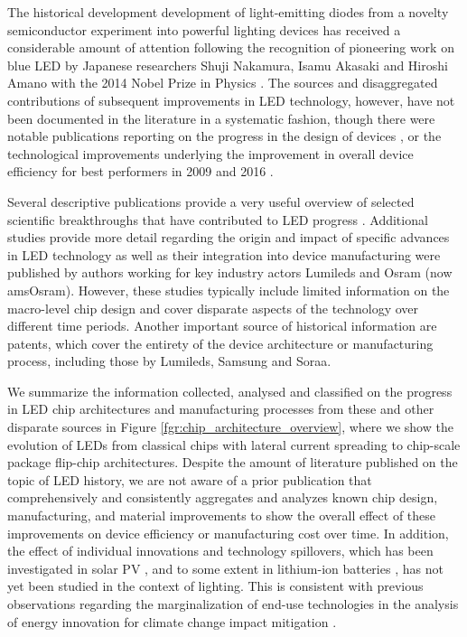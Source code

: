 \documentclass[10pt]{article}
\begin{document}
The historical development development of light-emitting diodes from a novelty semiconductor experiment into powerful lighting devices has received a considerable amount of attention following the recognition of pioneering work on blue LED by Japanese researchers Shuji Nakamura, Isamu Akasaki and Hiroshi Amano with the 2014 Nobel Prize in Physics \cite{Akasaki2015}\cite{Nakamura2015}. The sources and disaggregated contributions of subsequent improvements in LED technology, however, have not been documented in the literature in a systematic fashion, though there were notable publications reporting on the progress in the design of devices \cite{Shchekin2006}\cite{krames2007led}\cite{laubsch2009high}\cite{hahn2014development}, or the technological improvements  underlying the improvement in overall device efficiency for best performers in 2009 \cite{tsao2010solid} and 2016 \cite{pattison2017solid}. 

Several descriptive publications provide a very useful overview of selected scientific breakthroughs that have contributed to LED progress \cite{krames2007status}\cite{Phillips2007}\cite{Bierhuizen2007}\cite{Nakamura2013}\cite{feezell2018invention}\cite{Taki2019}. Additional studies provide more detail regarding the origin and impact of specific advances in LED technology as well as their integration into device manufacturing were published by authors working for key industry actors Lumileds\cite{MuellerMach2005}\cite{Shchekin2006}\cite{lumi2015lumi}\cite{Bhardwaj2017} and Osram (now amsOsram)\cite{Haerle2004}\cite{Baur2009}\cite{laubsch2009high}\cite{hahn2014development}. However, these studies typically include limited information on the macro-level chip design and cover disparate aspects of the technology over different time periods. Another important source of historical information are patents, which cover the entirety of the device architecture or manufacturing process, including those by Lumileds\cite{margalith2011thin}, Samsung\cite{jung2014phos}\cite{cha2019semiconductor} and Soraa\cite{cich2017high}.

We summarize the information collected, analysed and classified on the progress in LED chip architectures and manufacturing processes from these and other disparate sources in Figure \ref{fgr:chip_architecture_overview}, where we show the evolution of LEDs from classical chips with lateral current spreading to chip-scale package flip-chip architectures. Despite the amount of literature published on the topic of LED history, we are not aware of a prior publication that comprehensively and consistently aggregates and analyzes known chip design, manufacturing, and material improvements to show the overall effect of these improvements on device efficiency or manufacturing cost over time. In addition, the effect of individual innovations and technology spillovers, which has been investigated in solar PV \cite{kavlak2018evaluating}\cite{kolesnikov2020novel}\cite{nemet2019solar}, and to some extent in lithium-ion batteries \cite{Stephan2021}, has not yet been studied in the context of lighting. This is consistent with previous observations regarding the marginalization of end-use technologies in the analysis of energy innovation for climate change impact mitigation \cite{Wilson2012}\cite{Creutzig2018}.
\end{document}
